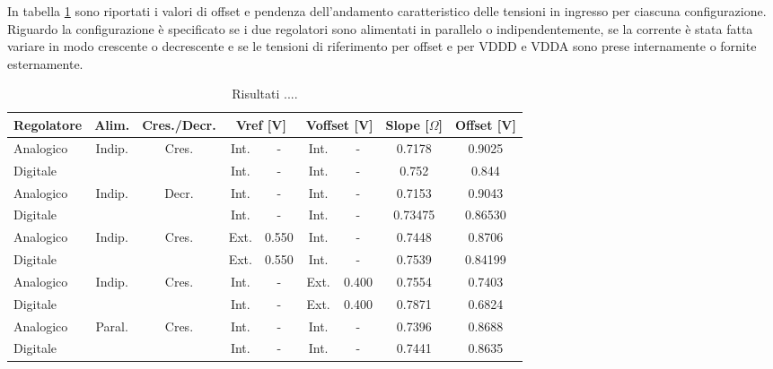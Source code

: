 In tabella \ref{table:results} sono riportati i valori di offset e pendenza dell'andamento caratteristico delle tensioni in ingresso per ciascuna configurazione. Riguardo la configurazione è specificato se i due regolatori sono alimentati in parallelo o indipendentemente, se la corrente è stata fatta variare in modo crescente o decrescente e se le tensioni di riferimento per offset e per VDDD e VDDA sono prese internamente o fornite esternamente.

\begin{center}
\begin{table}

\begin{tabular}{|l|c|c|c|c|c|c|c|c|}
\hline
Regolatore & Alim. & Cres./Decr. & \multicolumn{2}{c|}{Vref [V]} & \multicolumn{2}{c|}{Voffset [V]} & Slope [$\Omega$] & Offset [V]\\ \hline
 
Analogico & \multirow{2}{*}{Indip.} & \multirow{2}{*}{Cres.} & Int. & - & Int. & - & 0.7178 & 0.9025 \\
Digitale  &  &  & Int. & - & Int. & - & 0.752  & 0.844 \\ \hline

Analogico & \multirow{2}{*}{Indip.} & \multirow{2}{*}{Decr.} & Int. & - & Int. & - & 0.7153 & 0.9043 \\
Digitale  &  &  & Int. & - & Int. & - & 0.73475  & 0.86530 \\ \hline

Analogico & \multirow{2}{*}{Indip.} & \multirow{2}{*}{Cres.} & Ext. & 0.550 & Int. & - & 0.7448 & 0.8706 \\
Digitale  &  &  & Ext. & 0.550 & Int. & - & 0.7539  & 0.84199 \\ \hline

Analogico & \multirow{2}{*}{Indip.} & \multirow{2}{*}{Cres.} & Int. & - & Ext. & 0.400 & 0.7554 & 0.7403 \\
Digitale  &  &  & Int. & - & Ext. & 0.400 & 0.7871  & 0.6824 \\ \hline

Analogico & \multirow{2}{*}{Paral.} & \multirow{2}{*}{Cres.} & Int. & - & Int. & - & 0.7396 & 0.8688 \\
Digitale  &  &  & Int. & - & Int. & - & 0.7441  & 0.8635 \\ \hline

\end{tabular}
\caption{Risultati ....}
\label{table:results}
\end{table}
\end{center}
\afterpage{\clearpage}


